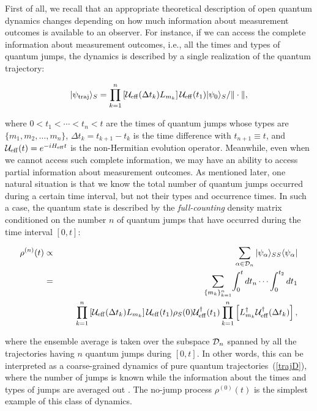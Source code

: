\documentclass{tADP2e}
\theoremstyle{plain}
\newcommand{\eqn}[1]{
\begin{eqnarray}
	#1
\end{eqnarray}
}
\theoremstyle{plain}
\theoremstyle{definition}
\begin{document}
First of all, we recall that an appropriate theoretical description of open quantum dynamics changes depending on how much information about measurement outcomes is available to an observer. For instance, if we can access the complete information about measurement outcomes, i.e., all the times and types of quantum jumps, the dynamics is described by a single realization of the quantum trajectory:
\eqn{
|\psi_{{\rm traj}}\rangle_{S}=\prod_{k=1}^{n}\left[ {{\cal U}}_{{\rm eff}}(\Delta t_{k}) {L}_{m_{k}}\right] {{\cal U}}_{{\rm eff}}(t_{1})|\psi_{0}\rangle_{S}/{\|\cdot\|},\label{trajD}
}
where $0\!<\!t_1\!<\!\cdots\!\!<\!t_n\!<\!t$ are the times of quantum jumps whose types are $\{m_1,m_2,\ldots,m_n\}$, $\Delta t_{k}=t_{k+1}-t_{k}$ is the time difference with $t_{n+1}\equiv t$, and $ {\cal U}_{\rm eff}(t)=e^{-i {H}_{\rm eff}t}$ is the non-Hermitian evolution operator.
Meanwhile, even when we cannot access such complete information,  we may have an ability to access partial information about measurement outcomes. As mentioned later, one natural situation is that we know the total number of quantum jumps occurred during a certain time interval, but not their types and occurrence times. In such a case, the quantum state is described by the {\it full-counting} density matrix conditioned on the number $n$ of quantum jumps that have occurred during the time interval $[0,t]$: 
\eqn{
 {\rho}^{(n)}(t)&\propto&\sum_{\alpha\in{\cal D}_{n}}|\psi_{\alpha}\rangle_{S}{}_{S}\langle\psi_{\alpha}|\nonumber\\
 &=&\!\sum_{\{m_{k}\}_{k=1}^{n}}\!\int_{0}^{t}dt_{n}\cdots\int_{0}^{t_{2}}dt_{1}\nonumber\\
&&\;\;\;\;\;\;\prod_{k=1}^{n}\left[ {\cal U}_{\rm eff}(\Delta t_{k}) {L}_{m_{k}}\right] {\cal U}_{\rm eff}(t_{1}) {\rho}_{S}(0) {\cal U}_{\rm eff}^{\dagger}(t_{1})\prod_{k=1}^{n}\left[ {L}_{m_{k}}^{\dagger} {\cal U}^{\dagger}_{\rm eff} (\Delta t_{k})\right],
\label{fcs2}
}
where the ensemble average is taken over the subspace ${\cal D}_{n}$ spanned by all the trajectories having $n$ quantum jumps during $[0,t]$. In other words, this can be interpreted as a coarse-grained dynamics of pure quantum trajectories~(\ref{trajD}), where the number of jumps is known while the information about the times and types of jumps are averaged out \cite{YA18}. The no-jump process $ {\rho}^{(0)}(t)$ is the simplest  example of this class of dynamics.  
\end{document}
